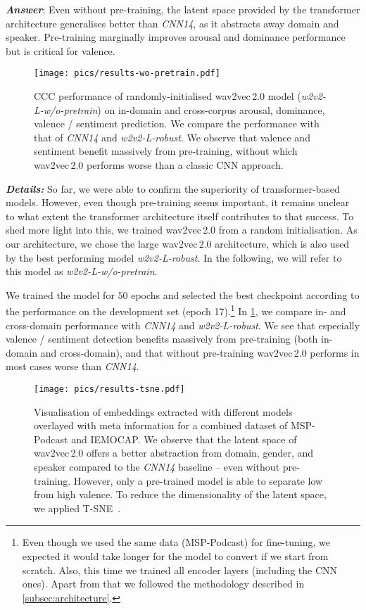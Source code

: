 \documentclass{article}
\newcommand\cnn{\mbox{\emph{CNN14}}}
\newcommand\wrobust{\mbox{\emph{w2v2-L-robust}}}
\newcommand\wwopre{\mbox{\emph{w2v2-L-w/o-pretrain}}}
\newcommand\msppodcast{\mbox{MSP-Podcast}}
\newcommand\iemocap{\mbox{IEMOCAP}}
\newcommand{\wtov}{wav2vec\,2.0}
\begin{document}
\emph{\textbf{Answer}}:
Even without pre-training,
the latent space provided by the transformer architecture generalises better than {\cnn},
as it abstracts away domain and speaker.
Pre-training marginally improves arousal and dominance performance
but is critical for valence.

\begin{figure}[t]
    \centering
    \texttt{[image: pics/results-wo-pretrain.pdf]}
    \caption{
        \ac{CCC} performance of randomly-initialised {\wtov} model (\emph{\wwopre}) on in-domain and cross-corpus arousal, dominance, valence / sentiment prediction.
        We compare the performance with that of \emph{\cnn} and \emph{\wrobust}. 
        We observe that valence and sentiment benefit massively from pre-training, without which {\wtov} performs worse than a classic CNN approach.
    }
    \label{fig:wo-pretrain}
\end{figure}

\noindent
\emph{\textbf{Details:}}
So far,
we were able to confirm the superiority of transformer-based models.
However, even though pre-training seems important,
it remains unclear to what extent the transformer architecture itself contributes to that success. 
To shed more light into this, we trained {\wtov} from a random initialisation. 
As our architecture,
we chose the large {\wtov} architecture,
which is also used by the best performing model {\wrobust}. 
In the following, we will refer to this model as {\wwopre}. 

We trained the model for $50$ epochs
and selected the best checkpoint
according to the performance on the development set (epoch 17).\footnote{
Even though we used the same data ({\msppodcast}) for fine-tuning,
we expected it would take longer for the model to convert if we start from scratch.
Also, this time we trained all encoder layers (including the CNN ones). 
Apart from that we followed the methodology described in \cref{subsec:architecture}.
}
In \cref{fig:wo-pretrain},
we compare in- and cross-domain performance with {\cnn} and {\wrobust}. 
We see that especially valence / sentiment detection benefits massively from pre-training
(both in-domain and cross-domain),
and that without pre-training {\wtov} performs in most cases worse than {\cnn}.

\begin{figure}[t]
    \centering
    \texttt{[image: pics/results-tsne.pdf]}
    \caption{
        Visualisation of embeddings extracted with different models overlayed with meta information for a combined dataset of {\msppodcast} and {\iemocap}. 
        We observe that the latent space of {\wtov} offers a better abstraction from domain, gender,  and speaker compared to the {\cnn} baseline -- even without pre-training. 
        However, only a pre-trained model is able to separate low from high valence. 
        To reduce the dimensionality of the latent space, we applied T-SNE~\citep{maaten2008tsne}.
    }
    \label{fig:embeddings}
\end{figure}
\end{document}
